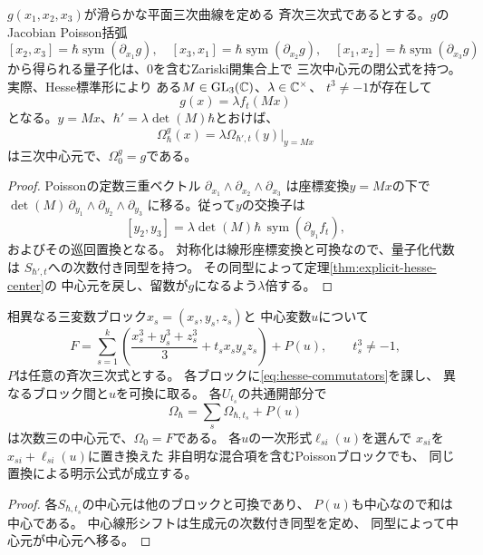 \begin{corollary}[任意の滑らかな三変数三次式]
\label{cor:arbitrary-smooth-ternary-cubic}
$g(x_1,x_2,x_3)$が滑らかな平面三次曲線を定める
斉次三次式であるとする。$g$のJacobian Poisson括弧
\[
 [x_2,x_3]=\hbar\operatorname{sym}(\partial_{x_1}g),
 \quad [x_3,x_1]=\hbar\operatorname{sym}(\partial_{x_2}g),
 \quad [x_1,x_2]=\hbar\operatorname{sym}(\partial_{x_3}g)
\]
から得られる量子化は、$0$を含むZariski開集合上で
三次中心元の閉公式を持つ。
実際、Hesse標準形\cite[Lemma 1]{ArtebaniDolgachev}により
ある$M\in\mathrm{GL}_3(\mathbb C)$、$\lambda\in\mathbb C^\times$、
$t^3\ne-1$が存在して
\[
 g(x)=\lambda f_t(Mx)
\]
となる。$y=Mx$、$\hbar'=\lambda\det(M)\hbar$とおけば、
\[
 \boxed{\ \Omega^g_\hbar(x)=
  \lambda\Omega_{\hbar',t}(y)\big|_{y=Mx}\ }
 \tag{HN}\label{eq:arbitrary-ternary-central}
\]
は三次中心元で、$\Omega^g_0=g$である。
\end{corollary}
\begin{proof}
Poissonの定数三重ベクトル
$\partial_{x_1}\wedge\partial_{x_2}\wedge\partial_{x_3}$
は座標変換$y=Mx$の下で
$\det(M)\,
 \partial_{y_1}\wedge\partial_{y_2}\wedge\partial_{y_3}$
に移る。従って$y$の交換子は
\[
 [y_2,y_3]
 =\lambda\det(M)\hbar\,
   \operatorname{sym}(\partial_{y_1}f_t),
\]
およびその巡回置換となる。
対称化は線形座標変換と可換なので、量子化代数は
$S_{\hbar',t}$への次数付き同型を持つ。
その同型によって定理\ref{thm:explicit-hesse-center}の
中心元を戻し、留数が$g$になるよう$\lambda$倍する。
\end{proof}

\begin{corollary}[中心変数と独立ブロックの閉公式]
\label{cor:hesse-block-center}
相異なる三変数ブロック$x_s=(x_s,y_s,z_s)$と
中心変数$u$について
\[
 F=\sum_{s=1}^k
 \left(\frac{x_s^3+y_s^3+z_s^3}{3}
       +t_sx_sy_sz_s\right)+P(u),
 \qquad t_s^3\ne-1,
\]
$P$は任意の斉次三次式とする。
各ブロックに\eqref{eq:hesse-commutators}を課し、
異なるブロック間と$u$を可換に取る。
各$U_{t_s}$の共通開部分で
\[
 \Omega_\hbar
   =\sum_s\Omega_{\hbar,t_s}+P(u)
 \tag{HB}\label{eq:hesse-multiblock}
\]
は次数三の中心元で、$\Omega_0=F$である。
各$u$の一次形式$\ell_{si}(u)$を選んで
$x_{si}$を$x_{si}+\ell_{si}(u)$に置き換えた
非自明な混合項を含むPoissonブロックでも、
同じ置換による明示公式が成立する。
\end{corollary}
\begin{proof}
各$S_{\hbar,t_s}$の中心元は他のブロックと可換であり、
$P(u)$も中心なので和は中心である。
中心線形シフトは生成元の次数付き同型を定め、
同型によって中心元が中心元へ移る。
\end{proof}


